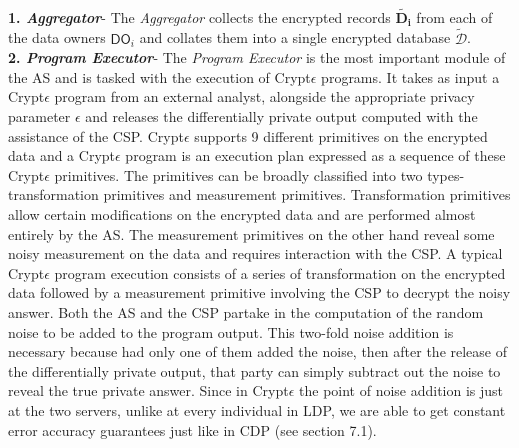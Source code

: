 \\
\textbf{1.\textit{ Aggregator}}- The \textit{Aggregator} collects the encrypted records $\mathbf{\tilde{D_i}}$ from each of the data owners $\textsf{DO}_i$ and collates them into a single encrypted database $\boldsymbol{\tilde{\mathcal{D}}}$. %
\\\textbf{2.\textit{ Program Executor}}- The \textit{Program Executor} is the most important module of the \textsf{AS} and is tasked with the execution of Crypt$\epsilon$ programs. It takes as input a Crypt$\epsilon$ program from an external analyst, alongside the appropriate privacy parameter $\epsilon$ and releases the differentially private output computed with the assistance of the \textsf{CSP}. Crypt$\epsilon$ supports 9 different primitives on the encrypted data and a Crypt$\epsilon$ program is an execution plan expressed as a sequence of these Crypt$\epsilon$ primitives. The primitives can be broadly classified into two types- transformation primitives and measurement primitives. Transformation primitives allow certain modifications on the encrypted data and are performed almost entirely by the \textsf{AS}. The measurement primitives on the other hand reveal some noisy measurement on the data and requires interaction with the \textsf{CSP}. A typical Crypt$\epsilon$ program execution consists of  a series of transformation on the encrypted data followed by a measurement primitive involving the \textsf{CSP} to decrypt the noisy answer. Both the \textsf{AS} and the \textsf{CSP} partake in the computation of the random noise to be added to the program output. This two-fold noise addition is necessary because  had only one of them added the noise, then after the release of the differentially private output, that party can simply subtract out the noise to reveal the true private answer. Since in Crypt$\epsilon$ the point of noise addition is just at the two servers, unlike at every individual in \textsf{LDP}, we are able to get constant error accuracy guarantees just like in \textsf{CDP} (see section 7.1). 
